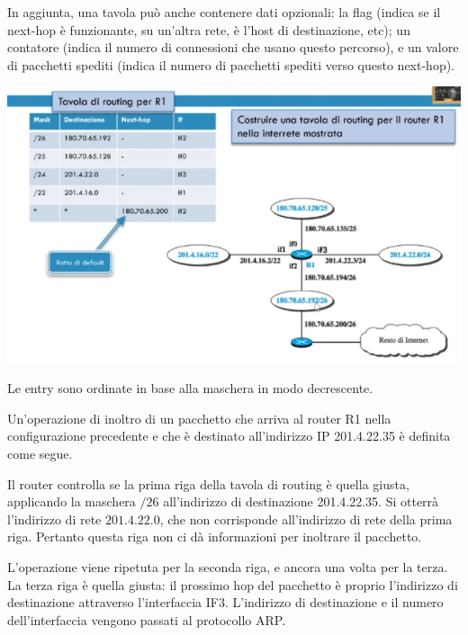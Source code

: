         In aggiunta, una tavola può anche contenere dati opzionali: la flag (indica se il next-hop è funzionante, su un'altra rete, è l'host di destinazione, etc); un contatore (indica il numero di connessioni che usano questo percorso), e un valore di pacchetti spediti (indica il numero di pacchetti spediti verso questo next-hop).
        
        \begin{center}
            \includegraphics[scale=0.4]{images/TavolaRoutingEsempio.png}
        \end{center}
        
        Le entry sono ordinate in base alla maschera in modo decrescente.
        
        \vspace{3mm}
        
        Un'operazione di inoltro di un pacchetto che arriva al router R1 nella configurazione precedente e che è destinato all'indirizzo IP 201.4.22.35 è definita come segue.
        
        Il router controlla se la prima riga della tavola di routing è quella giusta, applicando la maschera $/26$ all'indirizzo di destinazione 201.4.22.35. Si otterrà l'indirizzo di rete $201.4.22.0$, che non corrisponde all'indirizzo di rete della prima riga. Pertanto questa riga non ci dà informazioni per inoltrare il pacchetto.
        
        L'operazione viene ripetuta per la seconda riga, e ancora una volta per la terza. La terza riga è quella giusta: il prossimo hop del pacchetto è proprio l'indirizzo di destinazione attraverso l'interfaccia IF3. L'indirizzo di destinazione e il numero dell'interfaccia vengono passati al protocollo ARP.
        
